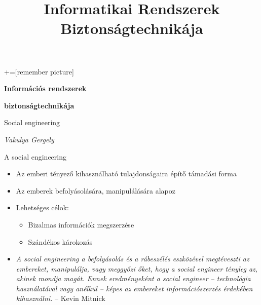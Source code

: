 \documentclass[12 pt]{beamer}
\author{}
\title{Informatikai Rendszerek Biztonságtechnikája}
\institute{}
\date{}
\begin{document}
+=[remember picture]

{

  \begin{frame}[c]
    \begin{center}

      \Large
      \textbf{Információs rendszerek}

      \textbf{biztonságtechnikája}

      \qquad

      Social engineering

      \qquad

      \textit{Vakulya Gergely}

    \end{center}
  \end{frame}
}


\begin{frame}{A social engineering}
  \begin{itemize}
    \item{Az emberi tényező kihasználható tulajdonságaira építő támadási forma}
    \item{Az emberek befolyásolására, manipulálására alapoz}
    \item{Lehetséges célok:}
      \begin{itemize}
        \item{Bizalmas információk megszerzése}
        \item{Szándékos károkozás}
      \end{itemize}
    \item{\textit{A social engineering a befolyásolás és a rábeszélés eszközével megtéveszti az embereket, manipulálja, vagy meggyőzi őket, hogy a social engineer tényleg az, akinek mondja magát. Ennek eredményeként a social engineer – technológia használatával vagy anélkül – képes az embereket információszerzés érdekében kihasználni.} -- Kevin Mitnick}
  \end{itemize}
\end{frame}
\end{document}
